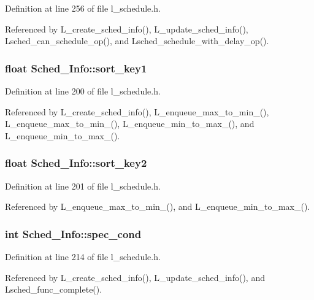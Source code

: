 Definition at line 256 of file l\_\-schedule.h.

Referenced by L\_\-create\_\-sched\_\-info(), L\_\-update\_\-sched\_\-info(), Lsched\_\-can\_\-schedule\_\-op(), and Lsched\_\-schedule\_\-with\_\-delay\_\-op().
\subsubsection{\setlength{\rightskip}{0pt plus 5cm}float \bf{Sched\_\-Info::sort\_\-key1}}\label{structSched__Info_eab19cb67f100c1e8739ff977a3589b1}




Definition at line 200 of file l\_\-schedule.h.

Referenced by L\_\-create\_\-sched\_\-info(), L\_\-enqueue\_\-max\_\-to\_\-min\_(), L\_\-enqueue\_\-max\_\-to\_\-min\_(), L\_\-enqueue\_\-min\_\-to\_\-max\_(), and L\_\-enqueue\_\-min\_\-to\_\-max\_().
\subsubsection{\setlength{\rightskip}{0pt plus 5cm}float \bf{Sched\_\-Info::sort\_\-key2}}\label{structSched__Info_3bdb78edd15e2d225e854f40b8ab3301}




Definition at line 201 of file l\_\-schedule.h.

Referenced by L\_\-enqueue\_\-max\_\-to\_\-min\_(), and L\_\-enqueue\_\-min\_\-to\_\-max\_().
\subsubsection{\setlength{\rightskip}{0pt plus 5cm}int \bf{Sched\_\-Info::spec\_\-cond}}\label{structSched__Info_a66483d138f7f1ee82ee3662381275f9}




Definition at line 214 of file l\_\-schedule.h.

Referenced by L\_\-create\_\-sched\_\-info(), L\_\-update\_\-sched\_\-info(), and Lsched\_\-func\_\-complete().
